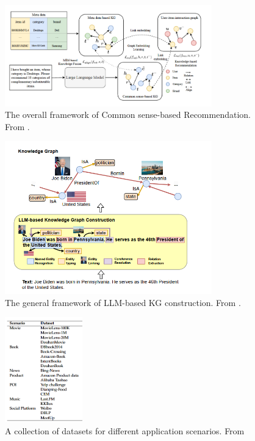 \documentclass[a4paper]{article}
\begin{document}
\begin{figure}[H]
\centering
\includegraphics[width=0.8\textwidth]{CSRec.png}
\caption{The overall framework of Common sense-based Recommendation. From \cite{yang2024common}.}
\label{fig:kg_construction}
\end{figure}
    
\begin{figure}[H]
\centering
\includegraphics[width=0.8\textwidth]{KG_construction.png}
\caption{The general framework of LLM-based KG construction. From \cite{pan2023unifying}.}
\label{fig:kg_construction}
\end{figure}

\begin{figure}[H]
\centering
\includegraphics[width=0.3\textwidth]{datasets.png}
\caption{A collection of datasets for different application scenarios. From \cite{guo2020survey} }
\label{fig:datasets}
\end{figure}
\end{document}
